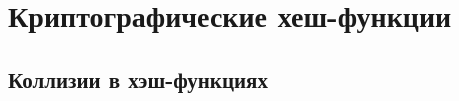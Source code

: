 \chapter{Криптографические хеш-функции}\label{chapter-hash-functions}







\section{Коллизии в хэш-функциях}




